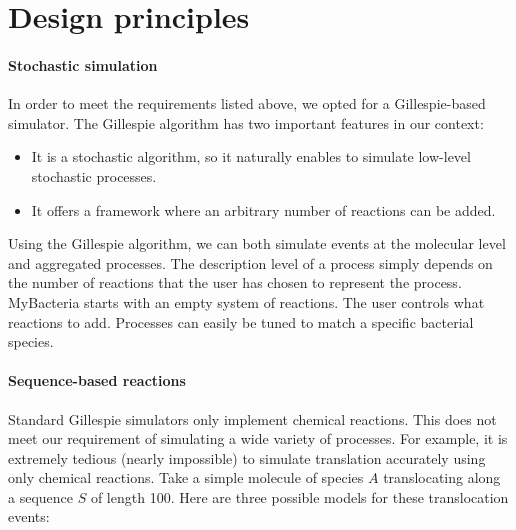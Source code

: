 \section{Design principles}

\paragraph{Stochastic simulation}
In order to meet the requirements listed above,
we opted for a Gillespie-based simulator.
The Gillespie algorithm has two important features in our context:
\begin{itemize}
  \item It is a stochastic algorithm, so it naturally enables to simulate
  low-level stochastic processes.
  \item It offers a framework where an arbitrary number of reactions can
  be added.
\end{itemize}
Using the Gillespie algorithm, we can both simulate events at the molecular
level and aggregated processes.
The description level of a process simply depends on the number of reactions
that the user has chosen to represent the process.
MyBacteria starts with an empty system of reactions.
The user controls what reactions to add.
Processes can easily be tuned to match a specific bacterial species.

\paragraph{Sequence-based reactions}
Standard Gillespie simulators only implement chemical reactions.
This does not meet our requirement of simulating a wide variety of processes.
For example, it is extremely tedious (nearly impossible) to simulate
translation accurately using only chemical reactions.
Take a simple molecule of species $A$ translocating along a sequence $S$
of length 100.
Here are three possible models for these translocation events:

